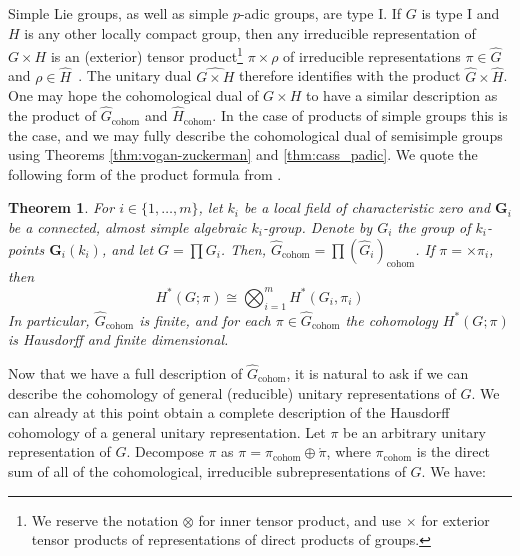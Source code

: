 \documentclass[12pt,reqno]{amsart}
\newtheorem{theorem}{Theorem}[section]
\theoremstyle{definition}
\begin{document}
Simple Lie groups, as well as simple $p$-adic groups, are type I. If $G$ is type I and $H$ is any other locally compact group, then any irreducible representation of $G \times H$ is an (exterior) tensor product\footnote{We reserve the notation $\otimes$ for inner tensor product, and use $\times$ for exterior tensor products of representations of  direct products of groups.} $\pi \times \rho$ of irreducible representations $\pi \in \widehat{G}$ and $\rho \in \widehat{H}$~\cite[Theorem 7.1]{Folland}. The unitary dual $\widehat{G \times H}$ therefore identifies with the product $\widehat{G} \times \widehat{H}$. One may hope the cohomological dual of $G \times H$ to have a similar description as the product of $\widehat{G}_{\mathrm{cohom}}$ and $\widehat{H}_{\mathrm{cohom}}$. In the case of products of simple groups this is the case, and we may fully describe the cohomological dual of semisimple groups using Theorems \ref{thm:vogan-zuckerman} and \ref{thm:cass_padic}.
We quote the following form of the product formula from \cite[Theorem~5.3]{BaderSauer}.
\begin{theorem}\label{thm:product formula}
    For $i \in \{1,\dots,m\}$, let $k_i$ be a local field of characteristic zero and $\mathbf{G}_i$ be a connected, almost simple algebraic $k_i$-group. Denote by $G_i$ the group of $k_i$-points $\mathbf{G}_i(k_i)$, and let $G=\prod G_i$. Then, $\widehat{G}_{\mathrm{cohom}}= \prod (\widehat{G}_i)_{\mathrm{cohom}}$. If $\pi= \times\pi_i$, then
    \[
    H^*(G;\pi) \cong \bigotimes_{i=1}^m H^*(G_i,\pi_i)
    \]
    In particular, $\widehat{G}_{\mathrm{cohom}}$ is finite, and for each $\pi \in \widehat{G}_{\mathrm{cohom}}$ the cohomology $H^*(G;\pi)$ is Hausdorff and finite dimensional. 
\end{theorem}


Now that we have a full description of $\widehat G_\mathrm{cohom}$, it is natural to ask if we can describe the cohomology of general (reducible) unitary representations of $G$. We can already at this point obtain a complete description of the Hausdorff cohomology of a general unitary representation. Let $\pi$ be an arbitrary unitary representation of $G$. Decompose $\pi$ as $\pi=\pi_\mathrm{cohom} \oplus \mathring\pi$, where $\pi_\mathrm{cohom}$ is the direct sum of all of the cohomological, irreducible subrepresentations of $G$. We have:
\end{document}
